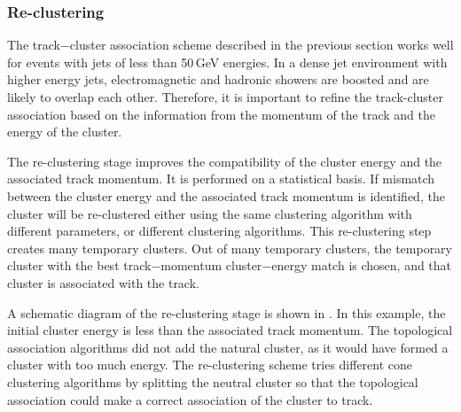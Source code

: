 

\subsubsection{Re-clustering}

The track$-$cluster association scheme described in the previous section works well for events with jets of less than 50\,GeV energies. In a dense jet environment with  higher energy jets, electromagnetic and  hadronic showers are  boosted and are likely to overlap each other. Therefore, it is important to refine the track-cluster association based on the information from the momentum of the track and the energy of the cluster.

The re-clustering stage improves the compatibility of the cluster energy and the associated track momentum. It is performed on a statistical basis. If mismatch between  the cluster energy and the associated track momentum is identified, the cluster will be re-clustered either using the same clustering algorithm with different parameters, or different clustering algorithms. This re-clustering step creates many temporary clusters. Out of many temporary clusters, the temporary cluster with the best track$-$momentum cluster$-$energy match is chosen, and that cluster is  associated with the track.


A schematic diagram of the re-clustering stage is shown in .  In this example, the initial cluster energy is less than the associated track momentum. The topological association algorithms did not add the natural cluster, as it would have formed a cluster with too much energy. The re-clustering scheme tries different cone clustering algorithms by splitting the neutral cluster so that the topological association could make a correct association of the cluster to track.


